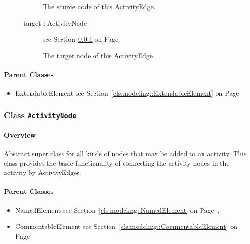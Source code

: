 \begin{description}
\begin{description}
	
			
The source node of this ActivityEdge.	
		
	
\item[target : ActivityNode 	]
see Section~\ref{cls:modeling::activities::ActivityNode} on Page~\pageref{cls:modeling::activities::ActivityNode}
\hspace{\fill}
\nopagebreak


	
			
The target node of this ActivityEdge.	
		
	
	\end{description}
	

\end{description}

\paragraph{Parent Classes}
\begin{itemize}
\item ExtendableElement see Section~\ref{cls:modeling::ExtendableElement} on Page~\pageref{cls:modeling::ExtendableElement}\end{itemize}
\subsubsection{\Large{Class \bfseries \texttt{ActivityNode}\normalfont}}
\label{cls:modeling::activities::ActivityNode} 
\paragraph{Overview}

	
			
Abstract super class for all kinds of nodes that may be added to an activity. This class provides the basic functionality of connecting the activity nodes in the activity by ActivityEdges.	
		
	



\paragraph{Parent Classes}
\begin{itemize}
\item NamedElement see Section~\ref{cls:modeling::NamedElement} on Page~\pageref{cls:modeling::NamedElement}, \item CommentableElement see Section~\ref{cls:modeling::CommentableElement} on Page~\pageref{cls:modeling::CommentableElement}\end{itemize}
